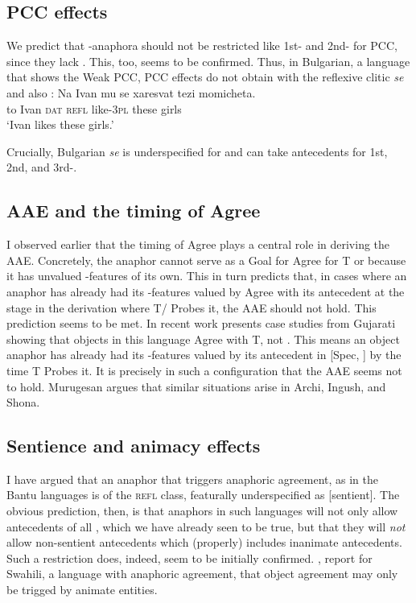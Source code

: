 \documentclass[output=paper, modfonts, nonflat]{langsci/langscibook}
\begin{document}
     \subsection{PCC effects}
  
     We predict that \nul-anaphora should not be restricted like 1st-
     and 2nd-\person{} for PCC, since they lack \person. This, too,
     seems to be confirmed. Thus, in Bulgarian, a language that shows
     the Weak PCC, PCC effects do not obtain with the reflexive clitic
     \textit{se} \citep[][500]{rivero:2004} and also
     \citet{nevins:2007}:
     \ea \gll Na Ivan mu se xaresvat tezi momicheta.\\
     to Ivan \textsc{dat} \textsc{refl} like-\textsc{3pl} these
     girls\\
     \glt `Ivan likes these girls.'  \z

 \noindent  Crucially, Bulgarian \textit{se} is underspecified for \person{}
     and can take antecedents for 1st, 2nd, and 3rd-\person.


      \subsection{AAE and the timing of Agree}

      I observed earlier that the timing of Agree plays a central role
      in deriving the AAE. Concretely, the anaphor cannot serve as a
      Goal for Agree for T or \lilv{} because it has unvalued
      \ph-features of its own. This in turn predicts that, in cases
      where an anaphor has already had its \ph-features valued by
      Agree with its antecedent at the stage in the derivation where
      T/\lilv{} Probes it, the AAE should not hold. This prediction
      seems to be met. In recent work \citet{murugesan:2018} presents
      case studies from Gujarati showing that objects in this language
      Agree with T, not \lilv. This means an object anaphor has
      already had its \ph-features valued by its antecedent in [Spec,
      \lilv] by the time T Probes it. It is precisely in such a
      configuration that the AAE seems not to hold. Murugesan argues
      that similar situations arise in Archi, Ingush, and Shona.  
      

      \subsection{Sentience and animacy effects}

      I have argued that an anaphor that triggers anaphoric agreement,
      as in the Bantu languages is of the \textsc{refl} class,
      featurally underspecified as [sentient]. The obvious prediction,
      then, is that anaphors in such languages will not only allow
      antecedents of all \person, which we have already seen to be
      true, but that they will \emph{not} allow non-sentient
      antecedents which (properly) includes inanimate
      antecedents. Such a restriction does, indeed, seem to be
      initially confirmed. \citet{woolford:1999}, \citet{vitale:1981} report
      for Swahili, a language with anaphoric agreement, that object
      agreement may only be trigged by animate entities. 
\end{document}
